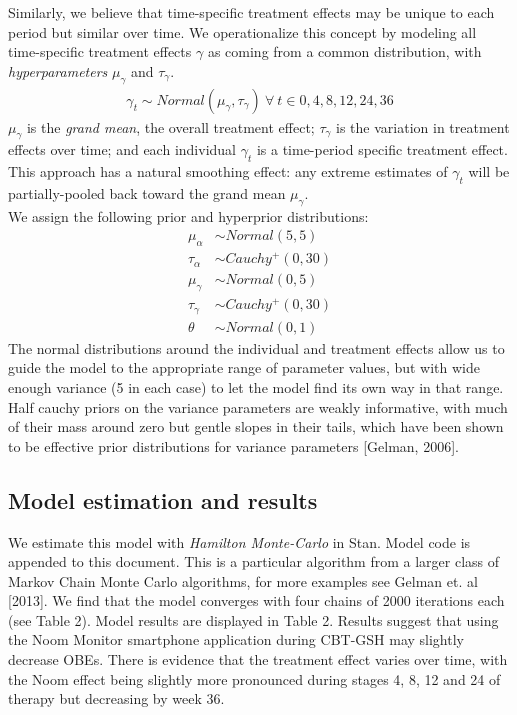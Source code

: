 \documentclass{article}
\begin{document}
%
Similarly, we believe that time-specific treatment effects may be unique to each period but similar over time. We operationalize this concept by modeling all time-specific treatment effects $\gamma$ as coming from a common distribution, with \emph{hyperparameters} $\mu_{\gamma}$ and $\tau_{\gamma}$.
%
\begin{align}
\gamma_t \sim Normal(\mu_{\gamma}, \tau_{\gamma}) \ \forall \ t \in 0, 4, 8, 12, 24, 36
\end{align} 
%
$\mu_{\gamma}$ is the \emph{grand mean}, the overall treatment effect; $\tau_{\gamma}$ is the variation in treatment effects over time; and each individual $\gamma_t$ is a time-period specific treatment effect.  This approach has a natural smoothing effect: any extreme estimates of $\gamma_t$ will be partially-pooled back toward the grand mean $\mu_{\gamma}$.\\
%
We assign the following prior and hyperprior distributions:
\begin{align}
\mu_{\alpha} &\sim Normal(5, 5) \\
\tau_{\alpha} &\sim Cauchy^+(0, 30) \\
\mu_{\gamma} &\sim Normal(0, 5) \\
\tau_{\gamma} &\sim Cauchy^+(0, 30) \\
\theta &\sim Normal(0, 1)
\end{align}
%
The normal distributions around the individual and treatment effects allow us to guide the model to the appropriate range of parameter values, but with wide enough variance (5 in each case) to let the model find its own way in that range.  Half cauchy priors on the variance parameters are weakly informative, with much of their mass around zero but gentle slopes in their tails, which have been shown to be effective prior distributions for variance parameters [Gelman, 2006].

\subsection{Model estimation and results}
We estimate this model with \emph{Hamilton Monte-Carlo} in Stan.  Model code is appended to this document. This is a particular algorithm from a larger class of Markov Chain Monte Carlo algorithms, for more examples see Gelman et. al [2013]. We find that the model converges with four chains of 2000 iterations each (see Table 2).
Model results are displayed in Table 2.  Results suggest that using the Noom Monitor smartphone application during CBT-GSH may slightly decrease OBEs.  There is evidence that the treatment effect varies over time, with the Noom effect being slightly more pronounced during stages 4, 8, 12 and 24 of therapy but decreasing by week 36.\\
\end{document}
